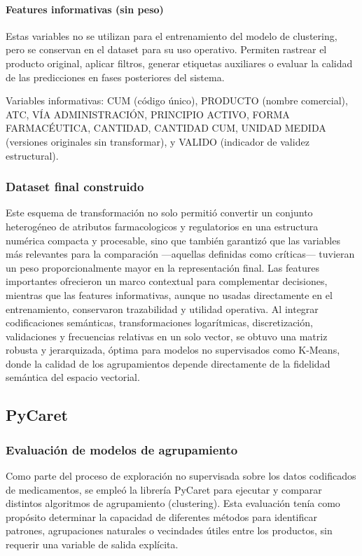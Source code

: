 \documentclass[conference]{IEEEtran}
\begin{document}
\paragraph{Features informativas (sin peso)}

Estas variables no se utilizan para el entrenamiento del modelo de clustering, pero se conservan en el dataset para su uso operativo. Permiten rastrear el producto original, aplicar filtros, generar etiquetas auxiliares o evaluar la calidad de las predicciones en fases posteriores del sistema.

Variables informativas: CUM (código único), PRODUCTO (nombre comercial), ATC, VÍA ADMINISTRACIÓN, PRINCIPIO ACTIVO, FORMA FARMACÉUTICA, CANTIDAD, CANTIDAD CUM, UNIDAD MEDIDA (versiones originales sin transformar), y VALIDO (indicador de validez estructural).

\subsubsection{Dataset final construido}

Este esquema de transformación no solo permitió convertir un conjunto heterogéneo de atributos farmacologicos y regulatorios en una estructura numérica compacta y procesable, sino que también garantizó que las variables más relevantes para la comparación —aquellas definidas como críticas— tuvieran un peso proporcionalmente mayor en la representación final. Las features importantes ofrecieron un marco contextual para complementar decisiones, mientras que las features informativas, aunque no usadas directamente en el entrenamiento, conservaron trazabilidad y utilidad operativa. Al integrar codificaciones semánticas, transformaciones logarítmicas, discretización, validaciones y frecuencias relativas en un solo vector, se obtuvo una matriz robusta y jerarquizada, óptima para modelos no supervisados como K-Means, donde la calidad de los agrupamientos depende directamente de la fidelidad semántica del espacio vectorial.

\subsection{PyCaret}

\subsubsection{Evaluación de modelos de agrupamiento}

Como parte del proceso de exploración no supervisada sobre los datos codificados de medicamentos, se empleó la librería PyCaret para ejecutar y comparar distintos algoritmos de agrupamiento (clustering). Esta evaluación tenía como propósito determinar la capacidad de diferentes métodos para identificar patrones, agrupaciones naturales o vecindades útiles entre los productos, sin requerir una variable de salida explícita.
\end{document}
